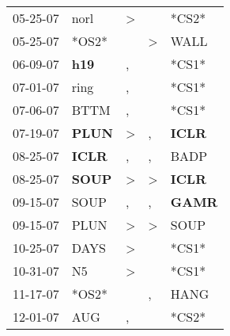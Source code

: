 \begin{supertabular}{p{0.07\textwidth}p{0.06\textwidth}p{0.02\textwidth}p{0.02\textwidth}p{0.06\textwidth}}
          05-25-07\textsuperscript{} &           norl\textsuperscript{} &     \textgreater &                  &                            *CS2* \\
          05-25-07\textsuperscript{} &                            *OS2* &                  &     \textgreater &           WALL\textsuperscript{} \\
          06-09-07\textsuperscript{} &   \textbf{h19\textsuperscript{}} &                , &                  &                            *CS1* \\
          07-01-07\textsuperscript{} &           ring\textsuperscript{} &                , &                  &                            *CS1* \\
          07-06-07\textsuperscript{} &           BTTM\textsuperscript{} &                , &                  &                            *CS1* \\
          07-19-07\textsuperscript{} &  \textbf{PLUN\textsuperscript{}} &     \textgreater &                , &  \textbf{ICLR\textsuperscript{}} \\
          08-25-07\textsuperscript{} &  \textbf{ICLR\textsuperscript{}} &                , &                , &           BADP\textsuperscript{} \\
          08-25-07\textsuperscript{} &  \textbf{SOUP\textsuperscript{}} &     \textgreater &     \textgreater &  \textbf{ICLR\textsuperscript{}} \\
          09-15-07\textsuperscript{} &           SOUP\textsuperscript{} &                , &                , &  \textbf{GAMR\textsuperscript{}} \\
          09-15-07\textsuperscript{} &           PLUN\textsuperscript{} &     \textgreater &     \textgreater &           SOUP\textsuperscript{} \\
          10-25-07\textsuperscript{} &           DAYS\textsuperscript{} &     \textgreater &                  &                            *CS1* \\
          10-31-07\textsuperscript{} &             N5\textsuperscript{} &     \textgreater &                  &                            *CS1* \\
          11-17-07\textsuperscript{} &                            *OS2* &                  &                , &           HANG\textsuperscript{} \\
          12-01-07\textsuperscript{} &            AUG\textsuperscript{} &                , &                  &                            *CS2* \\

\end{supertabular}
